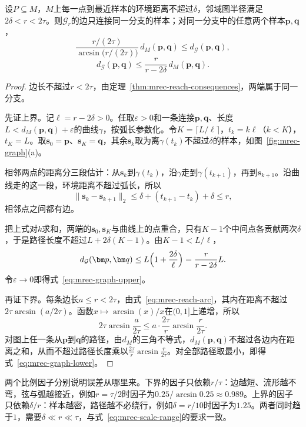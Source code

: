 \begin{theorem}[图距离逼近内在距离]
\label{thm:mrec-graph-distance}
设$P\subseteq M$，$M$上每一点到最近样本的环境距离不超过$\delta$，邻域图半径满足$2\delta<r<2\tau$。则$\mathcal G_r$的边只连接同一分支的样本；对同一分支中的任意两个样本$\bm p,\bm q$，
\begin{equation}
 \frac{r/(2\tau)}{\arcsin\bigl(r/(2\tau)\bigr)}\,d_M(\bm p,\bm q)\leq d_{\mathcal G}(\bm p,\bm q),
 \label{eq:mrec-graph-lower}
\end{equation}
\begin{equation}
 d_{\mathcal G}(\bm p,\bm q)\leq\frac r{r-2\delta}\,d_M(\bm p,\bm q).
 \label{eq:mrec-graph-upper}
\end{equation}
\end{theorem}
\begin{proof}
边长不超过$r<2\tau$，由定理~\ref{thm:mrec-reach-consequences}，两端属于同一分支。

先证上界。记$\ell=r-2\delta>0$。任取$\varepsilon>0$和一条连接$\bm p,\bm q$、长度$L<d_M(\bm p,\bm q)+\varepsilon$的曲线$\gamma$，按弧长参数化。令$K=\lceil L/\ell\rceil$，$t_k=k\ell$（$k<K$），$t_K=L$。取$\bm s_0=\bm p$、$\bm s_K=\bm q$，其余$\bm s_k$取为离$\gamma(t_k)$不超过$\delta$的样本，如图~\ref{fig:mrec-graph}(a)。

相邻两点的距离分三段估计：从$\bm s_k$到$\gamma(t_k)$，沿$\gamma$走到$\gamma(t_{k+1})$，再到$\bm s_{k+1}$。沿曲线走的这一段，环境距离不超过弧长，所以
\[
 \lVert\bm s_k-\bm s_{k+1}\rVert_2\leq\delta+(t_{k+1}-t_k)+\delta\leq r ,
\]
相邻点之间都有边。

把上式对$k$求和，两端的$\bm s_0,\bm s_K$与曲线上的点重合，只有$K-1$个中间点各贡献两次$\delta$，于是路径长度不超过$L+2\delta(K-1)$。由$K-1<L/\ell$，
\[
 d_{\mathcal G}(\bm p,\bm q)\leq L\Bigl(1+\frac{2\delta}\ell\Bigr)=\frac{r}{r-2\delta}L .
\]
令$\varepsilon\to0$即得式~\eqref{eq:mrec-graph-upper}。

再证下界。每条边长$a\leq r<2\tau$，由式~\eqref{eq:mrec-reach-arc}，其内在距离不超过$2\tau\arcsin(a/2\tau)$。函数$x\mapsto\arcsin(x)/x$在$(0,1]$上递增，所以
\[
 2\tau\arcsin\frac a{2\tau}\leq a\cdot\frac{2\tau}r\arcsin\frac r{2\tau}.
\]
对图上任一条从$\bm p$到$\bm q$的路径，由$d_M$的三角不等式，$d_M(\bm p,\bm q)$不超过各边内在距离之和，从而不超过路径长度乘以$\frac{2\tau}r\arcsin\frac r{2\tau}$。对全部路径取最小，即得式~\eqref{eq:mrec-graph-lower}。
\end{proof}

两个比例因子分别说明误差从哪里来。下界的因子只依赖$r/\tau$：边越短、流形越不弯，弦与弧越接近，例如$r=\tau/2$时因子为$0.25/\arcsin0.25\approx0.989$。上界的因子只依赖$\delta/r$：样本越密，路径越不必绕行，例如$\delta=r/10$时因子为$1.25$。两者同时趋于$1$，需要$\delta\ll r\ll\tau$，与式~\eqref{eq:mrec-scale-range}的要求一致。

